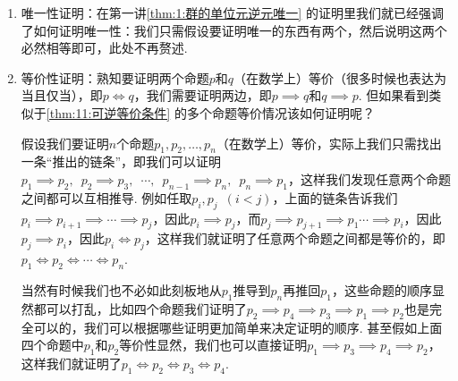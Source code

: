 \begin{enumerate}
\begin{theorem}
\begin{enumerate}
                  \item $\overline{a}=\overline{b}$.
              \end{enumerate}
          \end{theorem}
          \begin{proof}
              假设$\overline{a}\cap\overline{b}\neq\varnothing$，则存在$x\in\overline{a}\cap\overline{b}$，即$x\,R\,a$且$x\,R\,b$，因此由对称性有$a\,R\,x$，因此由传递性有$aRb$，因此根据等价类的定义可知，二者等价类必然相等，即$\overline{a}=\overline{b}$.
          \end{proof}

          事实上，上面用到的证明思想也涉及了排中律（即$p\lor\lnot p$为真）. 因为证明若$p$成立，则$q$和$r$都成立. 那么我们的思想是，要么$q$成立，得证，要么$\lnot q$成立，然后得出$\lnot q\to r$成立，根据蕴含的真值表知此时$r$必然成立，得证. 显然这一过程需要基于要么$q$成立，要么$\lnot q$成立这一排中律.

    \item 唯一性证明：在第一讲\autoref{thm:1:群的单位元逆元唯一} 的证明里我们就已经强调了如何证明唯一性：我们只需假设要证明唯一的东西有两个，然后说明这两个必然相等即可，此处不再赘述.

    \item 等价性证明：熟知要证明两个命题$p$和$q$（在数学上）等价（很多时候也表达为当且仅当），即$p\iff q$，我们需要证明两边，即$p\implies q$和$q\implies p$. 但如果看到类似于\autoref{thm:11:可逆等价条件} 的多个命题等价情况该如何证明呢？

          假设我们要证明$n$个命题$p_1,p_2,\ldots,p_n$（在数学上）等价，实际上我们只需找出一条``推出的链条''，即我们可以证明$p_1\implies p_2,\enspace p_2\implies p_3,\enspace \cdots,\enspace p_{n-1}\implies p_n,\enspace p_n\implies p_1$，这样我们发现任意两个命题之间都可以互相推导. 例如任取$p_i, p_j\enspace (i<j)$，上面的链条告诉我们$p_i\implies p_{i+1}\implies\cdots\implies p_j$，因此$p_i\implies p_j$，而$p_j\implies p_{j+1}\implies p_1\cdots\implies p_i$，因此$p_j\implies p_i$，因此$p_i\iff p_j$，这样我们就证明了任意两个命题之间都是等价的，即$p_1\iff p_2\iff\cdots\iff p_n$.

          当然有时候我们也不必如此刻板地从$p_1$推导到$p_n$再推回$p_1$，这些命题的顺序显然都可以打乱，比如四个命题我们证明了$p_2\implies p_4\implies p_3\implies p_1 \implies p_2$也是完全可以的，我们可以根据哪些证明更加简单来决定证明的顺序. 甚至假如上面四个命题中$p_1$和$p_2$等价性显然，我们也可以直接证明$p_1\implies p_3\implies p_4\implies p_2$，这样我们就证明了$p_1\iff p_2\iff p_3\iff p_4$.


\end{enumerate}
